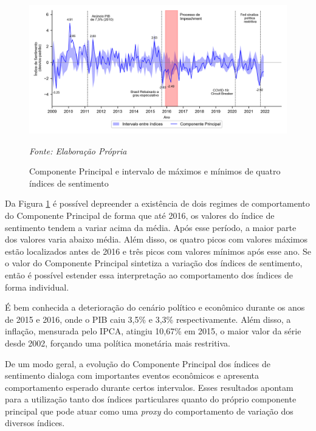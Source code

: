 \begin{figure}[H]
    \captionsetup{position=above} %
    \caption{Componente Principal e intervalo de máximos e mínimos de quatro índices de sentimento}
    \centering
    \includegraphics[width=\textwidth]{imagens/pca_plt.png} %
    \label{graf:pca}
    \par\noindent
    \begin{minipage}{\textwidth}
        \centering
        \footnotesize %
        \textit{Fonte: Elaboração Própria}
    \end{minipage}
\end{figure}

Da Figura \ref{graf:pca} é possível depreender a existência de dois regimes de comportamento do Componente Principal de forma que até 2016, os valores do índice de sentimento tendem a variar acima da média. Após esse período, a maior parte dos valores varia abaixo média. Além disso, os quatro picos com valores máximos estão localizados antes de 2016 e três picos com valores mínimos após esse ano. Se o valor do Componente Principal sintetiza a variação dos índices de sentimento, então é possível estender essa interpretação ao comportamento dos índices de forma individual.

É bem conhecida a deterioração do cenário político e econômico durante os anos de 2015 e 2016, onde o PIB caiu 3,5\% e 3,3\% respectivamente. Além disso, a inflação, mensurada pelo IPCA, atingiu 10,67\% em 2015, o maior valor da série desde 2002, forçando uma política monetária mais restritiva. 

De um modo geral, a evolução do Componente Principal dos índices de sentimento dialoga com importantes eventos econômicos e apresenta comportamento esperado durante certos intervalos. Esses resultados apontam para a utilização tanto dos índices particulares quanto do próprio componente principal que pode atuar como uma \textit{proxy} do comportamento de variação dos diversos índices. 

